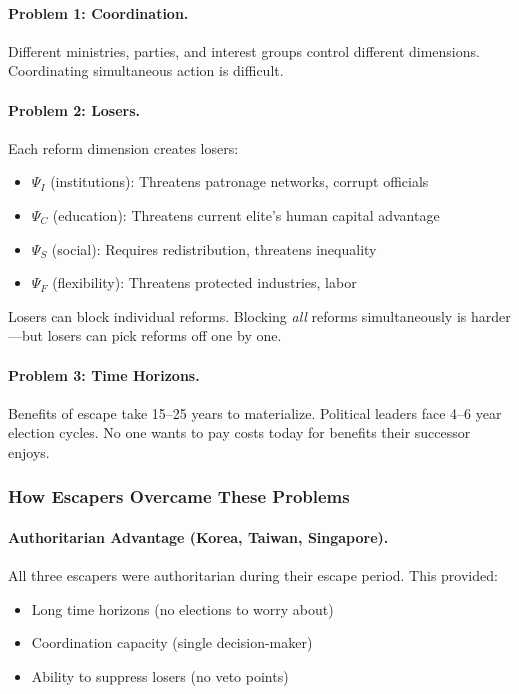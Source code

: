 \paragraph{Problem 1: Coordination.}
Different ministries, parties, and interest groups control different dimensions.
Coordinating simultaneous action is difficult.

\paragraph{Problem 2: Losers.}
Each reform dimension creates losers:
\begin{itemize}
    \item $\Psi_I$ (institutions): Threatens patronage networks, corrupt officials
    \item $\Psi_C$ (education): Threatens current elite's human capital advantage
    \item $\Psi_S$ (social): Requires redistribution, threatens inequality
    \item $\Psi_F$ (flexibility): Threatens protected industries, labor
\end{itemize}

Losers can block individual reforms. Blocking \emph{all} reforms simultaneously 
is harder---but losers can pick reforms off one by one.

\paragraph{Problem 3: Time Horizons.}
Benefits of escape take 15--25 years to materialize. Political leaders face 
4--6 year election cycles. No one wants to pay costs today for benefits 
their successor enjoys.

\subsubsection{How Escapers Overcame These Problems}

\paragraph{Authoritarian Advantage (Korea, Taiwan, Singapore).}
All three escapers were authoritarian during their escape period. This 
provided:
\begin{itemize}
    \item Long time horizons (no elections to worry about)
    \item Coordination capacity (single decision-maker)
    \item Ability to suppress losers (no veto points)
\end{itemize}

